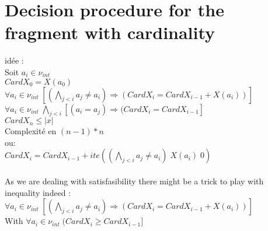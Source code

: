 
\section{Decision procedure for the fragment with cardinality}

idée :
\\ Soit $a_{i} \in \nu_{int}$
\\
$CardX_{0} = X(a_{0})$
\\
$\forall a_{i} \in \nu_{int} \; [(\bigwedge_{j<i} a_{j} \neq a_{i}) \Rightarrow (CardX_{i} = CardX_{i-1} + X(a_{i}))]$
\\
$\forall a_{i} \in \nu_{int} \; \bigwedge_{j<i} [(a_{i} = a_{j}) \Rightarrow (CardX_{i} = CardX_{i-1}]$
\\
$CardX_{n} \leq |x|$
\\
Complexité en $(n-1)*n$
\\
ou:
\\
$CardX_{i} = CardX_{i-1} + ite((\bigwedge_{j<i} a_{j} \neq a_{i}) \; X(a_{i}) \; 0)$
\\
\\
As we are dealing with satisfasibility there might be a trick to play with inequality indeed :
$\forall a_{i} \in \nu_{int} \; [(\bigwedge_{j<i} a_{j} \neq a_{i}) \Rightarrow (CardX_{i} = CardX_{i-1} + X(a_{i}))]$
\\
With
$\forall a_{i} \in \nu_{int} \; (CardX_{i} \geq CardX_{i-1}]$
\\

